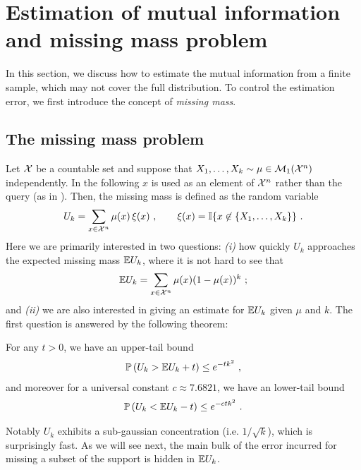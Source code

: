\section{Estimation of mutual information and missing mass problem}
\label{sec:missing_mass}
%
%
%
In this section, we discuss how to estimate the mutual information from a finite
sample, which may not cover the full distribution. To control the estimation
error, we first introduce the concept of \emph{missing mass}.
%
\subsection{The missing mass problem}
\label{sec:missing-mass}
%
%
Let ${\mathcal{X}}$ be a countable set and suppose that $X_1, \ldots, X_k \sim \mu \in {\mathcal{M}}_1({\mathcal{X}}^n)$ independently.
In the following $x$ is used as an element of ${\mathcal{X}}^n$ rather than the query (as in ).
Then, the missing mass is defined as the random variable
\begin{align*}
  U_k = \sum_{x \in {\mathcal{X}}^n} \mu(x) \, \xi(x)~,
  \qquad
  \xi(x) = \mathbb{I}\{x \not \in \{X_1, \ldots, X_k\}\}~.
\end{align*}
%
Here we are primarily interested in two questions: \emph{(i)} how quickly $U_k$ approaches the expected missing mass $\mathbb{E} U_k$, where it is not hard to see that
\begin{align*}
  \mathbb{E} U_k = \sum_{x \in {\mathcal{X}}^n} \mu(x) (1-\mu(x))^k~;
\end{align*}
and \emph{(ii)} we are also interested in giving an estimate for $\mathbb{E} U_k$ given $\mu$ and $k$.
%
The first question is answered by the following theorem:
%
\begin{theorem}
  \label{thm:missing-mass-concentration}
  For any $t > 0$, we have an upper-tail bound
  \begin{align*}
    \mathbb{P}\left( U_k > \mathbb{E} U_k + t \right) \leq e^{-t k^2}~,
  \end{align*}
  and moreover for a universal constant $c \approx 7.6821$, we have an lower-tail bound
  \begin{align*}
    \mathbb{P}\left( U_k < \mathbb{E} U_k - t \right) \leq e^{-c t k^2}~.
  \end{align*}
\end{theorem}
Notably $U_k$ exhibits a sub-gaussian concentration (i.e. $1/\sqrt{k}$), which is surprisingly fast.
As we will see next, the main bulk of the error incurred for missing a subset of the support is hidden in $\mathbb{E} U_k$.

